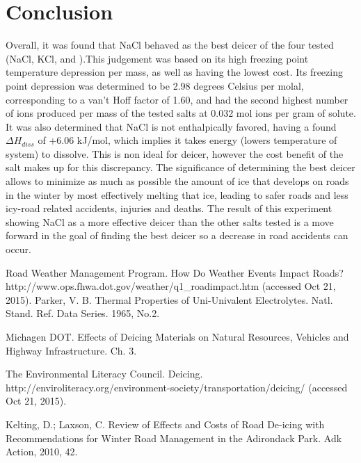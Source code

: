 \documentclass[12pt, letterpaper]{article}
\begin{document}
\section{Conclusion}
Overall, it was found that NaCl behaved as the best deicer of the four tested (NaCl, KCl,  and ).This judgement was based on its high freezing point temperature depression per mass, as well as having the lowest cost. Its freezing point depression was determined to be 2.98 degrees Celsius per molal, corresponding to a van't Hoff factor of 1.60, and had the second highest number of ions produced per mass of the tested salts at 0.032 mol ions per gram of solute. It was also determined that NaCl is not enthalpically favored, having a found $\Delta H_{diss}$ of +6.06 kJ/mol, which implies it takes energy (lowers temperature of system) to dissolve. This is non ideal for deicer, however the cost benefit of the salt makes up for this discrepancy. The significance of determining the best deicer allows to minimize as much as possible the amount of ice that develops on roads in the winter by most effectively melting that ice, leading to safer roads and less icy-road related accidents, injuries and deaths. The result of this experiment showing NaCl as a more effective deicer than the other salts tested is a move forward in the goal of finding the best deicer so a decrease in road accidents can occur.
\pagebreak
\begin{thebibliography}{11}
\raggedright
 Road Weather Management Program.
	How Do Weather Events Impact Roads?
	http://www.ops.fhwa.dot.gov/weather/q1\_roadimpact.htm
	(accessed Oct 21, 2015).
  Parker, V. B.
   Thermal Properties of Uni-Univalent Electrolytes.
   Natl. Stand. Ref. Data Series. 1965, No.2.

	Michagen DOT. 
Effects of Deicing Materials on Natural Resources, Vehicles and Highway Infrastructure. 
Ch. 3.
	
	The Environmental Literacy Council.
	Deicing.
	http://enviroliteracy.org/environment-society/transportation/deicing/
	(accessed Oct 21, 2015).
	
	Kelting, D.; Laxson, C. Review of Effects and Costs of Road De-icing with Recommendations for Winter Road Management in the Adirondack Park. Adk Action, 2010, 42.
	
\end{thebibliography}
\end{document}

